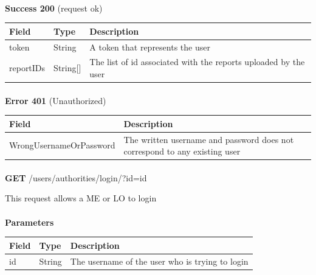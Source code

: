 						\paragraph{}
							\textbf{Success 200} (request ok)
							\begin{table}[!h]
								\begin{tabular}{L{0.2\textwidth}L{0.2\textwidth}L{0.4\textwidth}}
									\toprule
									Field & Type & Description \\
									\midrule
									token & String & A token that represents the user \\
									reportIDs & String[] & The list of id associated with the reports uploaded by the user \\
								 	\bottomrule
								\end{tabular}
							\end{table}
						\paragraph{}
							\textbf{Error 401} (Unauthorized)
							\begin{table}[!h]
								\begin{tabular}{L{0.4\textwidth}L{0.4\textwidth}}
									\toprule
									Field & Description \\
									\midrule
								  	WrongUsernameOrPassword & The written username and password does not correspond to any existing user \\
								 	\bottomrule
								\end{tabular}
							\end{table}
							
						\paragraph{}
						\textbf{GET} /users/authorities/login/?id={id}
						
						This request allows a ME or LO to login
						\paragraph{}
							\textbf{Parameters}
							\begin{table}[!h]
								\begin{tabular}{L{0.2\textwidth}L{0.2\textwidth}L{0.4\textwidth}}
									\toprule
									Field & Type & Description \\
									\midrule
								 	id & String & The username of the user who is trying to login \\
								 	\bottomrule
								\end{tabular}
							\end{table}
